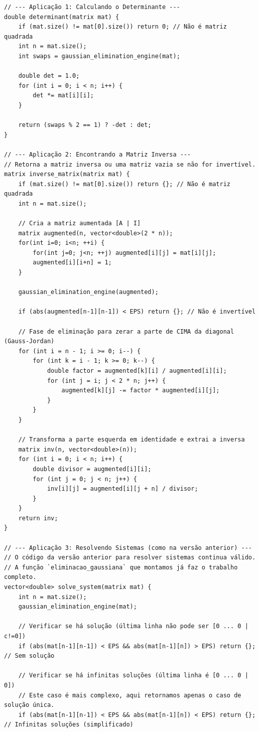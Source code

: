 \documentclass[11pt]{article}
\begin{document}
\begin{multicols}{2}
\begin{lstlisting}
// --- Aplicação 1: Calculando o Determinante ---
double determinant(matrix mat) {
    if (mat.size() != mat[0].size()) return 0; // Não é matriz quadrada
    int n = mat.size();
    int swaps = gaussian_elimination_engine(mat);
    
    double det = 1.0;
    for (int i = 0; i < n; i++) {
        det *= mat[i][i];
    }
    
    return (swaps % 2 == 1) ? -det : det;
}

// --- Aplicação 2: Encontrando a Matriz Inversa ---
// Retorna a matriz inversa ou uma matriz vazia se não for invertível.
matrix inverse_matrix(matrix mat) {
    if (mat.size() != mat[0].size()) return {}; // Não é matriz quadrada
    int n = mat.size();

    // Cria a matriz aumentada [A | I]
    matrix augmented(n, vector<double>(2 * n));
    for(int i=0; i<n; ++i) {
        for(int j=0; j<n; ++j) augmented[i][j] = mat[i][j];
        augmented[i][i+n] = 1;
    }

    gaussian_elimination_engine(augmented);

    if (abs(augmented[n-1][n-1]) < EPS) return {}; // Não é invertível

    // Fase de eliminação para zerar a parte de CIMA da diagonal (Gauss-Jordan)
    for (int i = n - 1; i >= 0; i--) {
        for (int k = i - 1; k >= 0; k--) {
            double factor = augmented[k][i] / augmented[i][i];
            for (int j = i; j < 2 * n; j++) {
                augmented[k][j] -= factor * augmented[i][j];
            }
        }
    }

    // Transforma a parte esquerda em identidade e extrai a inversa
    matrix inv(n, vector<double>(n));
    for (int i = 0; i < n; i++) {
        double divisor = augmented[i][i];
        for (int j = 0; j < n; j++) {
            inv[i][j] = augmented[i][j + n] / divisor;
        }
    }
    return inv;
}

// --- Aplicação 3: Resolvendo Sistemas (como na versão anterior) ---
// O código da versão anterior para resolver sistemas continua válido.
// A função `eliminacao_gaussiana` que montamos já faz o trabalho completo.
vector<double> solve_system(matrix mat) {
    int n = mat.size();
    gaussian_elimination_engine(mat);

    // Verificar se há solução (última linha não pode ser [0 ... 0 | c!=0])
    if (abs(mat[n-1][n-1]) < EPS && abs(mat[n-1][n]) > EPS) return {}; // Sem solução

    // Verificar se há infinitas soluções (última linha é [0 ... 0 | 0])
    // Este caso é mais complexo, aqui retornamos apenas o caso de solução única.
    if (abs(mat[n-1][n-1]) < EPS && abs(mat[n-1][n]) < EPS) return {}; // Infinitas soluções (simplificado)


\end{lstlisting}
\end{multicols}
\end{document}

